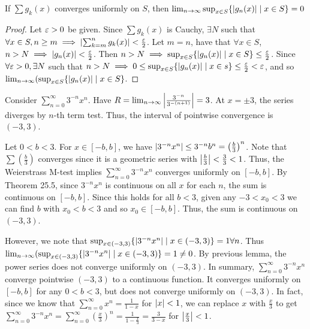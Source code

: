 \documentclass{article}
\begin{document}
\begin{lemma}
  If $\sum g_k(x)$ converges uniformly on $S$, then $\lim_{n\to\infty} \sup_{x \in S} \{\abs{g_n(x)} \mid x \in S\} = 0$
\end{lemma}
\begin{proof}
  Let $\varepsilon > 0$ be given. Since $\sum g_k(x)$ is Cauchy, $\exists N$ such that $\forall x \in S, n \geq m \implies \abs{\sum_{k=m}^n g_k(x)} < \frac{\varepsilon}{2}$. Let $m = n$, have that $\forall x \in S$, $n > N \implies \abs{g_n(x)} < \frac{\varepsilon}{2}$. Then $n > N \implies \sup_{x\in S} \{\abs{g_n(x)}\mid x \in S\} \leq \frac{\varepsilon}{2}$. Since $\forall \varepsilon > 0, \exists N$ such that $n > N \implies 0 \leq \sup_{x \in S} \{\abs{g_n(x)} \mid x \in s\} \leq \frac{\varepsilon}{2} < \varepsilon$, and so $\lim_{n\to\infty} (\sup_{x\in S} \{ \abs{g_n(x)} \mid x \in S\}$.
  \end{proof}
  \begin{example}
    Consider $\sum_{n=0}^\infty 3^{-n}x^n$. Have $R = \lim_{n\to\infty} \abs{\frac{3^{-n}}{3^{-(n+1)}}} = 3$. At $x = \pm 3$, the series diverges by $n$-th term test. Thus, the interval of pointwise convergence is $(-3, 3)$.

    Let $0 < b < 3$. For $x \in [-b, b]$, we have $\abs{3^{-n}x^n} \leq 3^{-n}b^n  = \left(\frac{b}{3}\right)^n$. Note that $\sum \left(\frac{b}{3}\right)$ converges since it is a geometric series with $\abs{\frac{b}{3}} < \frac{3}{3} < 1$. Thus, the Weierstrass M-test implies $\sum_{n=0}^\infty 3^{-n}x^n$ converges uniformly on $[-b, b]$. By Theorem 25.5, since $3^{-n}x^n$ is continuous on all $x$ for each $n$, the sum is continuous on $[-b, b]$. Since this holds for all $b < 3$, given any $-3 < x_0 < 3$ we can find $b$ with $x_0 < b < 3$ and so $x_0 \in [-b, b]$. Thus, the sum is continuous on $(-3, 3)$.

    However, we note that $\sup_{x \in (-3, 3)} \{\abs{3^{-n}x^n} \mid x \in (-3, 3)\} = 1 \forall n$. Thus $\lim_{n\to\infty} (\sup_{x \in (-3, 3)} \{\abs{3^{-n}x^n} \mid x \in (-3, 3)\} = 1 \neq 0$. By previous lemma, the power series does not converge uniformly on $(-3, 3)$. In summary, $\sum_{n=0}^\infty 3^{-n}x^n$ converge pointwise $(-3, 3)$ to a continuous function. It converges uniformly on $[-b, b]$ for any $0 < b < 3$, but does not converge uniformly on $(-3, 3)$. In fact, since we know that $\sum_{n=0}^\infty x^n = \frac{1}{1-x}$ for $\abs{x} < 1$, we can replace $x$ with $\frac{x}{3}$ to get $\sum_{n=0}^\infty 3^{-n}x^n = \sum_{n=0}^\infty \left(\frac{x}{3}\right)^n = \frac{1}{1-\frac{x}{3}} = \frac{3}{3 - x}$ for $\abs{\frac{x}{3}} < 1$.
    \end{example}
\end{document}
